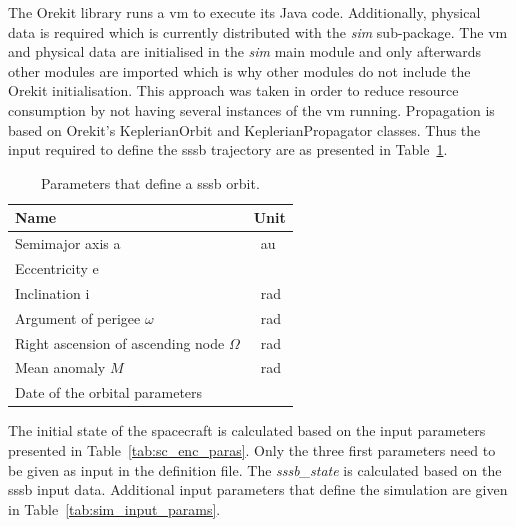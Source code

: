 The Orekit library runs a \gls{vm} to execute its Java code. Additionally, physical data is required which is currently distributed with the \textit{sim} sub-package. The \gls{vm} and physical data are initialised in the \textit{sim} main module and only afterwards other modules are imported which is why other modules do not include the Orekit initialisation. This approach was taken in order to reduce resource consumption by not having several instances of the \gls{vm} running. Propagation is based on Orekit's KeplerianOrbit and KeplerianPropagator classes. Thus the input required to define the \gls{sssb} trajectory are as presented in Table~\ref{tab:keplerorbit_params}.

\begin{table}[htb]
    \centering
    \caption{Parameters that define a \gls{sssb} orbit.}
    \label{tab:keplerorbit_params}
    \begin{tabular}{p{}|p{}}
        \textbf{Name}    & \textbf{Unit} \\ \hline
        Semi\-major axis a & \SI{}{\astronomicalunit} \\
        Eccentricity e & \SI{}{} \\
        Inclination i & \SI{}{\radian} \\
        Argument of perigee  $\omega$ & \SI{}{\radian}  \\
        Right ascension of ascending node $\Omega$ & \SI{}{\radian} \\
        Mean anomaly $M$ & \SI{}{\radian}\\
        Date of the orbital parameters &  
    \end{tabular}
\end{table}

The initial state of the spacecraft is calculated based on the input parameters presented in Table~\ref{tab:sc_enc_paras}. Only the three first parameters need to be given as input in the definition file. The \textit{sssb\_state} is calculated based on the \gls{sssb} input data. Additional input parameters that define the simulation are given in Table~\ref{tab:sim_input_params}.

